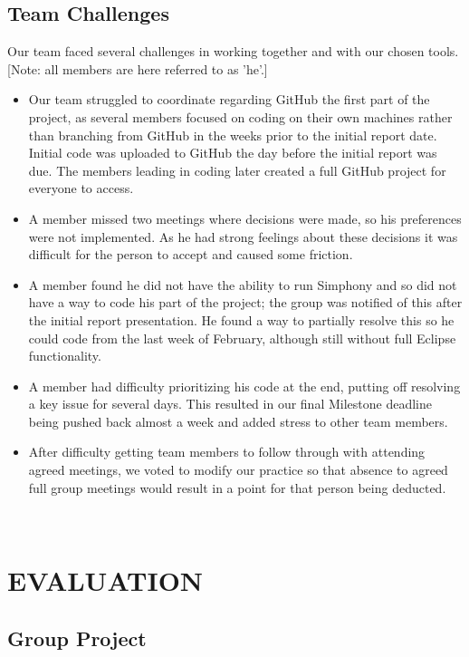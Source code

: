 \documentclass[11pt]{article}
\begin{document}
\begin{enumerate}
\subsection{Team Challenges}

Our team faced several challenges in working together and with our chosen tools. [Note: all members are here referred to as \textquoteright he\textquoteright .] 

\begin{itemize}\itemsep0pt
\item Our team struggled to coordinate regarding GitHub the first part of the project, as several members focused on coding on their own machines rather than branching from GitHub in the weeks prior to the initial report date. Initial code was uploaded to GitHub the day before the initial report was due. The members leading in coding later created a full GitHub project for everyone to access. 
\item A member missed two meetings where decisions were made, so his preferences were not implemented. As he had strong feelings about these decisions it was difficult for the person to accept and caused some friction.
\item A member found he did not have the ability to run Simphony and so did not have a way to code his part of the project; the group was notified of this after the initial report presentation. He found a way to partially resolve this so he could code from the last week of February, although still without full Eclipse functionality. 
\item A member had difficulty prioritizing his code at the end, putting off resolving a key issue for several days. This resulted in our final Milestone deadline being pushed back almost a week and added stress to other team members.
\item After difficulty getting team members to follow through with attending agreed meetings, we voted to modify our practice so that absence to agreed full group meetings would result in a point for that person being deducted.
\end{itemize}
\\


\section{EVALUATION}


\subsection{Group Project}


\end{enumerate}
\end{document}
